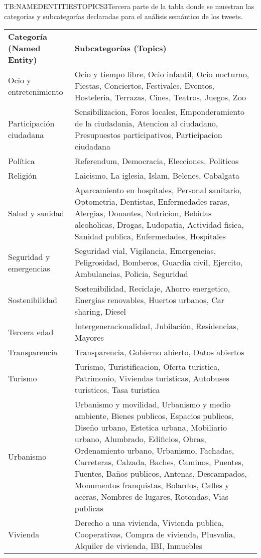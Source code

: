 \begin{table}[Relación de categorías y subcategorías para análisis semántico (III)]{TB:NAMEDENTITIESTOPICS3}{Tercera parte de la tabla donde se muestran las categorías y subcategorías declaradas para el análisis semántico de los tweets.}
	
	\begin{tabular}{|p{4.5cm}|p{12cm}|}
		\hline
		\textbf{Categoría (Named Entity)} & \textbf{Subcategorías (Topics)} \\
		Ocio y entretenimiento &  Ocio y tiempo libre, Ocio infantil, Ocio nocturno, Fiestas, Conciertos, Festivales, Eventos, Hosteleria, Terrazas, Cines, Teatros, Juegos, Zoo \\
		Participación ciudadana &  Sensibilizacion, Foros locales, Emponderamiento de la ciudadania, Atencion al ciudadano, Presupuestos participativos, Participacion ciudadana \\
		Política &  Referendum, Democracia, Elecciones, Politicos \\
		Religión &  Laicismo, La iglesia, Islam, Belenes, Cabalgata \\
		Salud y sanidad &  Aparcamiento en hospitales, Personal sanitario, Optometria, Dentistas, Enfermedades raras, Alergias, Donantes, Nutricion, Bebidas alcoholicas, Drogas, Ludopatia, Actividad fisica, Sanidad publica, Enfermedades, Hospitales \\
		Seguridad y emergencias &  Seguridad vial, Vigilancia, Emergencias, Peligrosidad, Bomberos, Guardia civil, Ejercito, Ambulancias, Policia, Seguridad \\
		Sostenibilidad &  Sostenibilidad, Reciclaje, Ahorro energetico, Energias renovables, Huertos urbanos, Car sharing, Diesel \\
		Tercera edad &  Intergeneracionalidad, Jubilación, Residencias, Mayores \\
		Transparencia &  Transparencia, Gobierno abierto, Datos abiertos \\
		Turismo &  Turismo, Turistificacion, Oferta turistica, Patrimonio, Viviendas turisticas, Autobuses turisticos, Tasa turistica \\
		Urbanismo &  Urbanismo y movilidad, Urbanismo y medio ambiente, Bienes publicos, Espacios publicos, Diseño urbano, Estetica urbana, Mobiliario urbano, Alumbrado, Edificios, Obras, Ordenamiento urbano, Urbanismo, Fachadas, Carreteras, Calzada, Baches, Caminos, Puentes, Fuentes, Baños publicos, Antenas, Descampados, Monumentos franquistas, Bolardos, Calles y aceras, Nombres de lugares, Rotondas, Vias publicas \\
		Vivienda &  Derecho a una vivienda, Vivienda publica, Cooperativas, Compra de vivienda, Plusvalia, Alquiler de vivienda, IBI, Inmuebles \\
		\hline \hline
		\hline
	\end{tabular}
\end{table}


